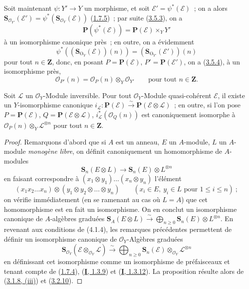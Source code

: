 \begin{env}[4.1.3]
\label{II.4.1.3-fr}
Soit maintenant $\psi:Y'\to Y$ un morphisme, et soit
$\mathcal{E}'=\psi^*(\mathcal{E})$~; on a alors
$\mathbf{S}_{\mathcal{O}_{Y'}}(\mathcal{E}')=
\psi^*(\mathbf{S}_{\mathcal{O}_Y}(\mathcal{E}))$
(\hyperref[II.1.7.5-fr]{1.7.5})~; par suite
(\hyperref[II.3.5.3-fr]{3.5.3}), on a
\[
\label{II.4.1.3.1-fr}
  \mathbf{P}(\psi^*(\mathcal{E}))=
  \mathbf{P}(\mathcal{E})\times_YY'
\tag{4.1.3.1}
\]
à un isomorphisme canonique près~; en outre, on a évidemment
\[
  \psi^*((\mathbf{S}_{\mathrm{O}_Y}(\mathcal{E}))(n))
  =(\mathbf{S}_{\mathrm{O}_{Y'}}(\mathcal{E}'))(n)
\]
pour tout $n\in\mathbf{Z}$, donc, en posant $P=\mathbf{P}(\mathcal{E})$,
$P'=\mathbf{P}(\mathcal{E}')$, on a
(\hyperref[II.3.5.4-fr]{3.5.4}), à un isomorphisme près,
\[
\label{II.4.1.3.2-fr}
  \mathcal{O}_{P'}(n)=\mathcal{O}_P(n)\otimes_Y\mathcal{O}_{Y'}
  \qquad\text{pour tout }n\in\mathbf{Z}.
\tag{4.1.3.2}
\]
\end{env}


\begin{proposition}[4.1.4]
\label{II.4.1.4-fr}
Soit $\mathcal{L}$ un $\mathcal{O}_Y$-Module inversible. Pour tout
$\mathcal{O}_Y$-Module quasi-cohérent $\mathcal{E}$, il existe un
$Y$-isomorphisme canonique
$i_{\mathcal{L}}:\mathbf{P}(\mathcal{E})\xrightarrow{\sim}
\mathbf{P}(\mathcal{E}\otimes\mathcal{L})$~; en outre, si l'on pose
$P=\mathbf{P}(\mathcal{E})$, $Q=\mathbf{P}(\mathcal{E}\otimes\mathcal{L})$,
$i_{\mathcal{L}}^*(\mathcal{O}_Q(n))$ est canoniquement isomorphe à
$\mathcal{O}_P(n)\otimes_Y\mathcal{L}^{\otimes n}$ pour tout
$n\in\mathbf{Z}$.
\end{proposition}

\begin{proof}
Remarquons d'abord que si $A$ est un anneau, $E$ un $A$-module, $L$ un
$A$-module \emph{monogène libre}, on définit canoniquement un homomorphisme
de $A$-modules
\[
  \mathbf{S}_n(E\otimes L)\longrightarrow
  \mathbf{S}_n(E)\otimes L^{\otimes n}
\]
en faisant correspondre à
$(x_1\otimes y_1)\ldots(x_n\otimes y_n)$ l'élément
\[
  (x_1x_2\ldots x_n)\otimes(y_1\otimes y_2\otimes\ldots\otimes y_n)
  \qquad(x_i\in E,\ y_i\in L\text{ pour }1\leq i\leq n)~;
\]
on vérifie immédiatement (en se ramenant au cas où $L=A$) que cet
homomorphisme est en fait un isomorphisme. On en conclut un isomorphisme
canonique de $A$-algèbres graduées
$\mathbf{S}_A(E\otimes L)\xrightarrow{\sim}
\bigoplus_{n\geq0}\mathbf{S}_n(E)\otimes L^{\otimes n}$. En revenant aux
conditions de (4.1.4), les remarques précédentes permettent de définir un
isomorphisme canonique de $\mathcal{O}_Y$-Algèbres graduées
\[
\label{II.4.1.4.1-fr}
  \mathbf{S}_{\mathcal{O}_Y}(\mathcal{E}\otimes_{\mathcal{O}_Y}\mathcal{L})
  \xrightarrow{\sim}
  \bigoplus_{n\geq0}\mathbf{S}_n(\mathcal{E})
  \otimes_{\mathcal{O}_Y}\mathcal{L}^{\otimes n}
\tag{4.1.4.1}
\]
en définissant cet isomorphisme comme un isomorphisme de préfaisceaux et
tenant compte de (\hyperref[II.1.7.4-fr]{1.7.4}),
(\hyperref[I.1.3.9-fr]{\textbf{I}, 1.3.9}) et
(\hyperref[I.1.3.12-fr]{\textbf{I}, 1.3.12}). La proposition résulte alors de
(\hyperref[II.3.1.8-fr]{3.1.8, (iii)}) et
(\hyperref[II.3.2.10-fr]{3.2.10}).
\end{proof}

